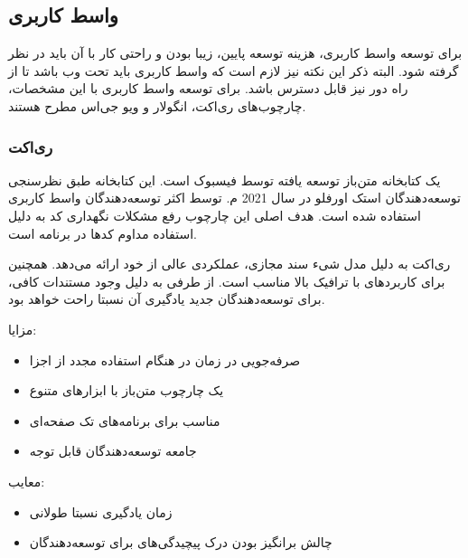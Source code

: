 \subsection{واسط کاربری}

برای توسعه واسط کاربری، هزینه توسعه پایین، زیبا بودن و راحتی کار با آن باید در نظر گرفته شود. البته ذکر این نکته نیز لازم است که واسط کاربری  باید تحت وب باشد تا از راه دور نیز قابل دسترس باشد. برای توسعه واسط کاربری با این مشخصات، چارچوب‌های ری‌اکت، انگولار و ویو جی‌اس مطرح هستند.

\newpage


\subsubsection{ری‌اکت}

یک کتابخانه متن‌باز توسعه یافته توسط فیسبوک است. این کتابخانه طبق نظرسنجی توسعه‌دهندگان استک اورفلو در سال 2021 م. توسط اکثر توسعه‌دهندگان واسط کاربری استفاده شده است\cite{stackoverflow_stack_nodate}. هدف اصلی این چارچوب رفع مشکلات نگهداری کد به دلیل استفاده مداوم کدها در برنامه است.


ری‌اکت به دلیل مدل شیء سند مجازی، عملکردی عالی از خود ارائه می‌دهد. همچنین برای کاربردهای با ترافیک بالا مناسب است. از طرفی به دلیل وجود مستندات کافی، برای توسعه‌دهندگان جدید یادگیری آن نسبتا راحت خواهد بود\cite{technologies_what_2021}.



مزایا:
\begin{itemize}
    \item صرفه‌جویی در زمان در هنگام استفاده مجدد از اجزا
    \item یک چارچوب متن‌باز با ابزارهای متنوع
    \item مناسب برای برنامه‌های تک صفحه‌ای
    \item جامعه توسعه‌دهندگان قابل توجه
\end{itemize}

معایب:

\begin{itemize}
    \item زمان یادگیری نسبتا طولانی
    \item چالش برانگیز بودن درک پیچیدگی‌های  برای توسعه‌دهندگان
\end{itemize}

